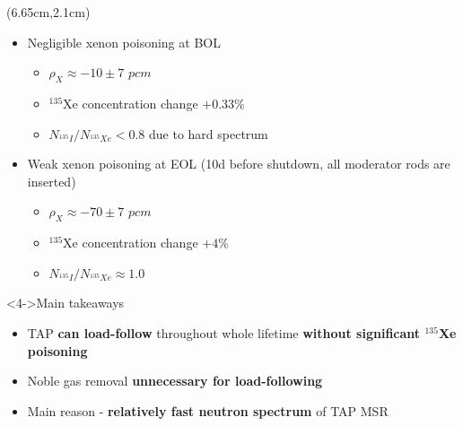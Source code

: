 \begin{frame}
\begin{textblock*}{12.5cm}
\begin{columns}
	\column[t]{5.5cm}
	\begin{textblock*}{6cm}(6.65cm,2.1cm) %
		\fontsize{7}{9}\selectfont
		\begin{itemize}
		\item<1-> Negligible xenon poisoning at BOL
			\begin{itemize}
				\item $\rho_X\approx-10\pm7$ $pcm$
				\item $^{135}$Xe concentration change $+0.33$\%
				\item $N_{^{135}I}/N_{^{135}Xe}<0.8$ due to hard spectrum
			\end{itemize} 
			\item<2-> Weak xenon poisoning at EOL (10d before shutdown, all 
			moderator rods are inserted)
			\begin{itemize}
				\item $\rho_X\approx-70\pm7$ $pcm$
				\item<3-> $^{135}$Xe concentration change $+4$\%
				\item<3-> $N_{^{135}I}/N_{^{135}Xe}\approx1.0$
			\end{itemize}
		\end{itemize}
				\vspace{+5mm}
		\begin{block}<4->{\qquad Main takeaways}
			\begin{itemize}
				\item TAP \textbf{can load-follow} throughout whole
			lifetime \textbf{without significant $^{135}$Xe poisoning}
				\item Noble gas removal \textbf{unnecessary for load-following}
				\item Main reason - \textbf{relatively fast neutron spectrum} 
				of TAP MSR
			\end{itemize}
		
	\end{block}
	\end{textblock*}
\end{columns}
\end{textblock*}
\end{frame}



